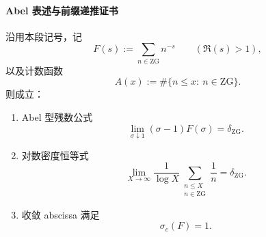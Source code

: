 \paragraph{Abel 表述与前缀递推证书}

\begin{theorem}[Zeckendorf--Gödel Dirichlet 级数在 \texorpdfstring{$s=1$}{s=1} 的 Abel 型残数公式、对数密度与收敛 abscissa]\label{thm:xi-zg-abel-residue-log-density}
沿用本段记号，记
\[
F(s):=\sum_{n\in\mathrm{ZG}}n^{-s}
\qquad (\Re(s)>1),
\]
以及计数函数
\[
A(x):=\#\{n\le x:\ n\in\mathrm{ZG}\}.
\]
则成立：
\begin{enumerate}
  \item Abel 型残数公式
  \[
  \lim_{\sigma\downarrow 1}(\sigma-1)F(\sigma)=\delta_{\mathrm{ZG}}.
  \]
  \item 对数密度恒等式
  \[
  \lim_{X\to\infty}\frac{1}{\log X}
  \sum_{\substack{n\le X\\ n\in\mathrm{ZG}}}\frac{1}{n}
  =\delta_{\mathrm{ZG}}.
  \]
  \item 收敛 abscissa 满足
  \[
  \sigma_c(F)=1.
  \]
\end{enumerate}
\end{theorem}
